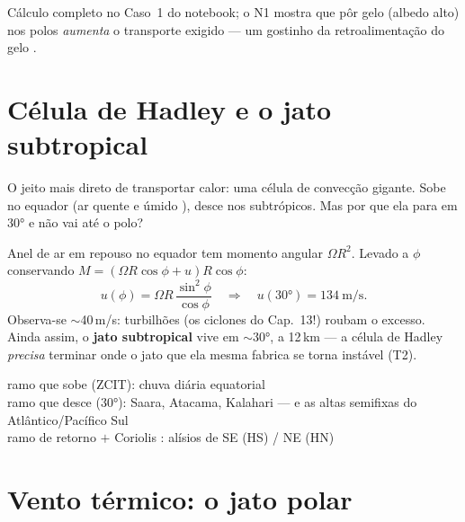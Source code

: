 \documentclass[11pt]{article}
\begin{document}
Cálculo completo no Caso~1 do notebook; o N1 mostra que pôr gelo
(albedo alto) nos polos \emph{aumenta} o transporte exigido — um gostinho
da retroalimentação do gelo .

\section{Célula de Hadley e o jato subtropical}\label{sec:hadley}


O jeito mais direto de transportar calor: uma célula de convecção
gigante. Sobe no equador (ar quente e úmido ), desce nos subtrópicos. Mas por que ela para em $30°$ e não
vai até o polo?

\begin{formadif}
Anel de ar em repouso no equador tem momento angular $\Omega R^2$.
Levado a $\phi$ conservando
$M = (\Omega R\cos\phi + u)R\cos\phi$:
\[ u(\phi) = \Omega R\,\frac{\sin^2\phi}{\cos\phi}
\quad\Rightarrow\quad u(30°) = 134\ \mathrm{m/s}. \]
Observa-se $\sim$40\,m/s: turbilhões (os ciclones do Cap.~13!) roubam o
excesso. Ainda assim, o \textbf{jato subtropical} vive em $\sim$30°, a
12\,km — a célula de Hadley \emph{precisa} terminar onde o jato que ela
mesma fabrica se torna instável (T2).
\end{formadif}

\begin{noquadro}
ramo que sobe (ZCIT): chuva diária equatorial \hfill
{}\\
ramo que desce ($30°$): Saara, Atacama, Kalahari — e as altas
semifixas do Atlântico/Pacífico Sul\\
ramo de retorno $+$ Coriolis : alísios de SE
(HS) / NE (HN)
\end{noquadro}

\section{Vento térmico: o jato polar}\label{sec:termico}

\end{document}
